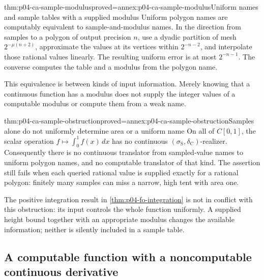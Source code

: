 \begin{hbtheorem}{thm:p04-ca-sample-modulus}{proved=annex:p04-ca-sample-modulus}{Uniform names and sample tables with a supplied modulus}
Uniform polygon names are computably equivalent to sample-and-modulus
names. In the direction from samples to a polygon of output precision
\(n\), use a dyadic partition of mesh
\(2^{-\mu(n+2)}\), approximate the values at its vertices within
\(2^{-n-2}\), and interpolate those rational values linearly.
The resulting uniform error is at most \(2^{-n-1}\).
The converse computes the table and a modulus from the polygon name.
\end{hbtheorem}

This equivalence is between kinds of input information. Merely knowing
that a continuous function has a modulus does not supply the integer
values of a computable modulus or compute them from a weak name.

\begin{hbtheorem}{thm:p04-ca-sample-obstruction}{proved=annex:p04-ca-sample-obstruction}{Samples alone do not uniformly determine area or a uniform name}
On all of \(C[0,1]\), the scalar operation
\(f\mapsto\int_0^1 f(x)\,dx\) has no continuous
\((\sigma_{\mathrm S},\delta_{\mathrm C})\)-realizer.
Consequently there is no continuous translator from sampled-value names
to uniform polygon names, and no computable translator of that kind.
The assertion still fails when each queried rational value is supplied
exactly for a rational polygon: finitely many samples can miss a narrow,
high tent with area one.
\end{hbtheorem}

The positive integration result in \cref{thm:p04-fo-integration} is not
in conflict with this obstruction: its input controls the whole function
uniformly. A supplied height bound together with an appropriate modulus
changes the available information; neither is silently included in a
sample table.

\subsection{A computable function with a noncomputable continuous derivative}
\label{sec:p04-ca-bumps}

